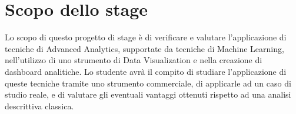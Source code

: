 \section*{Scopo dello stage}
Lo scopo di questo progetto di stage è di verificare e valutare l'applicazione di tecniche di Advanced Analytics, supportate da tecniche di Machine Learning, nell'utilizzo di uno strumento di Data Visualization e nella creazione di dashboard analitiche.
Lo studente avrà il compito di studiare l'applicazione di queste tecniche tramite uno strumento commerciale, di applicarle ad un caso di studio reale, e di valutare gli eventuali vantaggi ottenuti rispetto ad una analisi descrittiva classica.

